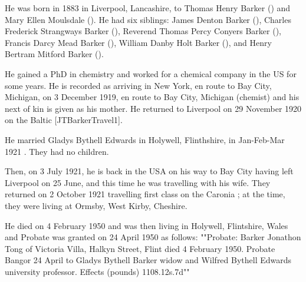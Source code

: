 
He was born in 1883 \cite{JTBarkerBirth} in Liverpool, Lancashire, to Thomas Henry Barker () and Mary Ellen Moulsdale (). He had six siblings:  James Denton Barker (), Charles Frederick Strangways Barker (),  Reverend Thomas Percy Conyers Barker (), Francis Darcy Mead Barker (), William Danby Holt Barker (), and Henry Bertram Mitford Barker (). 

He gained a PhD in chemistry and worked for a chemical company in the US for some years. He is recorded as arriving in New York, en route to Bay City, Michigan, on 3 December 1919, en route to Bay City, Michigan (chemist) and his next of kin is given as his mother. He returned to Liverpool on 29 November 1920 on the Baltic [JTBarkerTravel1]. 

He married Gladys Bythell Edwards in Holywell, Flinthshire, in Jan-Feb-Mar 1921 \cite{JTBarkerMarriage}. They had  no children.

 Then, on 3 July 1921, he is back in the USA on his way to Bay City having left Liverpool on 25 June, and this time he was travelling with his wife. They returned on 2 October 1921 travelling first class on the Caronia \cite{JTBarkerTravel2};  at the time,  they were living at Ormsby, West Kirby, Cheshire. 

He died on 4 February 1950 and was then living in Holywell, Flintshire, Wales and Probate was granted  on 24 April 1950 as follows:   
""Probate: Barker Jonathon Tong of Victoria Villa, Halkyn Street, Flint died 4 February 1950. Probate Bangor 24 April to Gladys Bythell Barker widow and Wilfred Bythell Edwards university professor. Effects (pounds) 1108.12s.7d""


